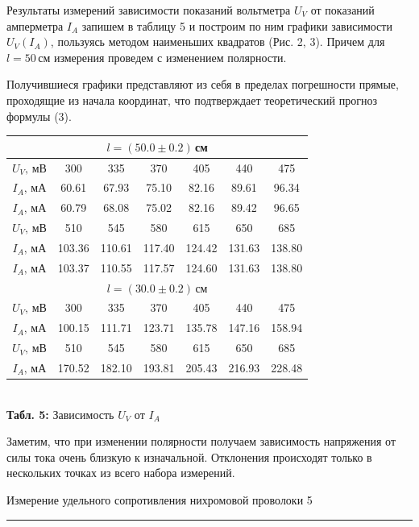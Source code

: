 \documentclass[12pt,a4paper]{scrartcl}
\begin{document}
	\par Результаты измерений зависимости показаний вольтметра $U_V$ от показаний амперметра $I_A$ запишем в таблицу 5 и построим по ним графики зависимости $U_V(I_A)$, пользуясь методом наименьших квадратов (Рис. 2, 3). Причем для $l = 50\,$см измерения проведем с изменением полярности.
	\par Получившиеся графики представляют из себя в пределах погрешности прямые, проходящие из начала координат, что подтверждает теоретический прогноз формулы (3).
	\begin{center}
		\begin{tabular}{|c|c|c|c|c|c|c|}
			\hline \multicolumn{7}{|c|}{$l = (50.0 \pm 0.2)\,$см} 			\\\hline $U_V,\,$мВ & 300 & 335 & 370 & 405 & 440 & 475 
			\\\hline $I_A,\,$мА & 60.61 & 67.93 & 75.10 & 82.16 & 89.61 & 96.34 
			\\\hline $I_A,\,$мА & 60.79 & 68.08 & 75.02 & 82.16 & 89.42 & 96.65
			\\\hline $U_V,\,$мВ & 510 & 545 & 580 & 615 & 650 & 685
			\\\hline $I_A,\,$мА & 103.36 & 110.61 & 117.40 & 124.42 & 131.63 & 138.80
			\\\hline $I_A,\,$мА & 103.37 & 110.55 & 117.57 & 124.60 & 131.63 & 138.80
			\\\hline \multicolumn{7}{|c|}{$l = (30.0 \pm 0.2)\,$см}
			\\\hline $U_V,\,$мВ & 300 & 335 & 370 & 405 & 440 & 475 
			\\\hline $I_A,\,$мА & 100.15 & 111.71 & 123.71 & 135.78 & 147.16 & 158.94 
			\\\hline $U_V,\,$мВ & 510 & 545 & 580 & 615 & 650 & 685
			\\\hline $I_A,\,$мА & 170.52 & 182.10 & 193.81 & 205.43 & 216.93 & 228.48
			\\\hline
		\end{tabular}
		\\\textbf{Табл. 5:} Зависимость $U_V$ от $I_A$
	\end{center}

	Заметим, что при изменении полярности получаем зависимость напряжения от силы тока очень близкую к изначальной. Отклонения происходят только в нескольких точках из всего набора измерений.
	
	\newpage
	\begin{flushleft}
		\footnotesize{Измерение удельного сопротивления нихромовой проволоки} \hspace{\fill} \footnotesize{5}
		\\[-0.3cm]\noindent\rule{\textwidth}{0.3pt}
	\end{flushleft}
\end{document}
